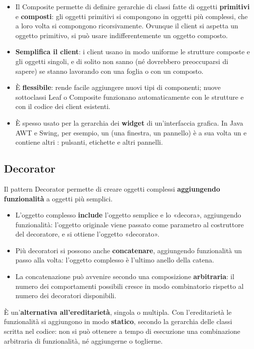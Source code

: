 \begin{itemize}
  \item Il Composite permette di definire gerarchie di classi fatte di oggetti \textbf{primitivi} e \textbf{composti}: gli
        oggetti primitivi si compongono in oggetti più complessi, che a loro volta si compongono ricorsivamente. Ovunque il
        client si aspetta un oggetto primitivo, si può usare indifferentemente un oggetto composto.
  \item \textbf{Semplifica il client}: i client usano in modo uniforme le strutture composte e gli oggetti singoli, e di
        solito non sanno (né dovrebbero preoccuparsi di sapere) se stanno lavorando con una foglia o con un composto.
  \item È \textbf{flessibile}: rende facile aggiungere nuovi tipi di componenti; nuove sottoclassi Leaf o Composite
        funzionano automaticamente con le strutture e con il codice dei client esistenti.
  \item È spesso usato per la gerarchia dei \textbf{widget} di un'interfaccia grafica. In Java AWT e Swing, per esempio,
        un  (una finestra, un pannello) è a sua volta un  e contiene altri
        : pulsanti, etichette e altri pannelli.
\end{itemize}

\subsection{Decorator}

Il pattern Decorator permette di creare oggetti complessi \textbf{aggiungendo funzionalità} a oggetti più semplici.
\begin{itemize}
  \item L'oggetto complesso \textbf{include} l'oggetto semplice e lo «decora», aggiungendo funzionalità: l'oggetto originale
        viene passato come parametro al costruttore del decoratore, e si ottiene l'oggetto «decorato».
  \item Più decoratori si possono anche \textbf{concatenare}, aggiungendo funzionalità un passo alla volta: l'oggetto
        complesso è l'ultimo anello della catena.
  \item La concatenazione può avvenire secondo una composizione \textbf{arbitraria}: il numero dei comportamenti possibili
        cresce in modo combinatorio rispetto al numero dei decoratori disponibili.
\end{itemize}
È un'\textbf{alternativa all'ereditarietà}, singola o multipla. Con l'ereditarietà le funzionalità si aggiungono in modo
\textbf{statico}, secondo la gerarchia delle classi scritta nel codice: non si può ottenere a tempo di esecuzione una
combinazione arbitraria di funzionalità, né aggiungerne o toglierne.

